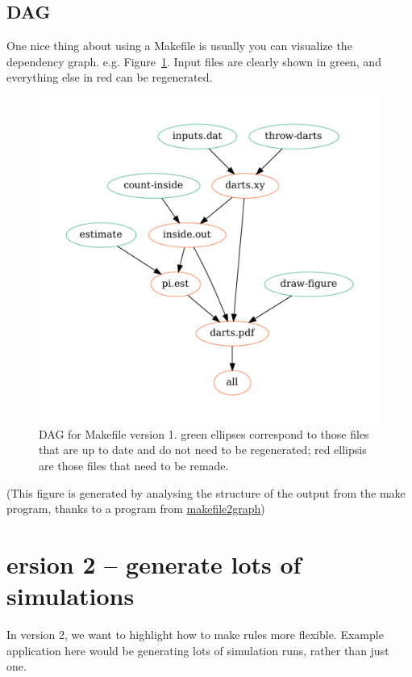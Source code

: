 \documentclass[12pt]{article}\usepackage[]{graphicx}\usepackage[]{color}
\begin{document}
\subsection{DAG}

One nice thing about using a Makefile is usually you can visualize the
dependency graph.  e.g.  Figure~\ref{fig:dag}.  Input files are
clearly shown in green, and everything else in red can be regenerated.


\begin{figure}
  \centering
	\includegraphics{v1-R/graph.pdf}
  \caption{DAG for Makefile version 1.  green ellipses correspond to
    those files that are up to date and do not need to be regenerated;
  red ellipsis are those files that need to be remade.}
  \label{fig:dag}
\end{figure}


(This figure is generated by analysing the structure of the output
from the make program, thanks to a program from \url{makefile2graph})

\clearpage

\section{ersion 2 -- generate lots of simulations}

In version 2, we want to highlight how to make rules more flexible.
Example application here would be generating lots of simulation runs,
rather than just one.
\end{document}
